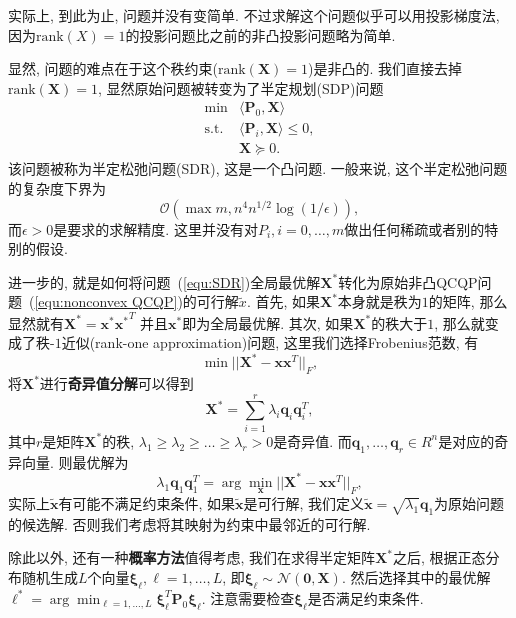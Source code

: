 \documentclass[a4paper,12pt]{article}
\begin{document}
实际上, 到此为止, 问题并没有变简单. 不过求解这个问题似乎可以用投影梯度法, 因为$\text{rank}(X)=1$的投影问题比之前的非凸投影问题略为简单.

显然, 问题的难点在于这个秩约束($\text{rank}(\bm{X}) = 1$)是非凸的.
我们直接去掉$\text{rank}(\bm{X}) = 1$, 显然原始问题被转变为了半定规划(SDP)问题
\begin{equation} \label{equ:SDR}
\begin{array}{cl}
{\min} & {\langle \bm{P}_0,\bm{X} \rangle} \\
{\text{s.t.}} & {\langle \bm{P}_i,\bm{X} \rangle \leq 0}, \\
{} & {\bm{X} \succeq 0}.
\end{array}
\end{equation}
该问题被称为半定松弛问题(SDR), 这是一个凸问题.
一般来说, 这个半定松弛问题的复杂度下界为
\begin{equation}
\mathcal{O}(\max{m,n}^4 n^{1/2}\log(1/\epsilon)),
\end{equation}
而$\epsilon>0$是要求的求解精度. 这里并没有对$P_i, i=0,\dots,m$做出任何稀疏或者别的特别的假设.

进一步的, 就是如何将问题~(\ref{equ:SDR})全局最优解$\bm{X}^*$转化为原始非凸QCQP问题~(\ref{equ:nonconvex QCQP})的可行解$\tilde{x}$. 
首先, 如果$\bm{X}^*$本身就是秩为$1$的矩阵, 那么显然就有$\bm{X}^* = \bm{x}^* {\bm{x}^*}^T$ 并且$\bm{x}^*$即为全局最优解.
其次, 如果$\bm{X}^*$的秩大于$1$, 那么就变成了秩-$1$近似(rank-one approximation)问题, 这里我们选择Frobenius范数, 有
\begin{equation}
\min || \bm{X}^* - \bm{x}\bm{x}^T ||_F,
\end{equation}
将$\bm{X}^*$进行\textbf{奇异值分解}可以得到
\begin{equation}
\bm{X}^* = \sum_{i=1}^r \lambda_i \bm{q}_i \bm{q}_i^T,
\end{equation}
其中$r$是矩阵$\bm{X}^*$的秩, $\lambda_1 \ge \lambda_2 \ge \dots \ge \lambda_r > 0$是奇异值.
而$\bm{q}_1,\dots,\bm{q}_r \in R^n$是对应的奇异向量.
则最优解为
\begin{equation}
\lambda_1 \bm{q}_1 \bm{q}_1^T = \arg\min_{\bm{x}} ||\bm{X}^* - \bm{x}\bm{x}^T||_F,
\end{equation}
实际上$\tilde{\bm{x}}$有可能不满足约束条件, 如果$\tilde{\bm{x}}$是可行解, 我们定义$\tilde{\bm{x}} = \sqrt{\lambda_1}\bm{q}_1$为原始问题的候选解.
否则我们考虑将其映射为约束中最邻近的可行解.

除此以外, 还有一种\textbf{概率方法}值得考虑, 我们在求得半定矩阵$\bm{X}^*$之后, 根据正态分布随机生成$L$个向量$\bm{\xi}_{\ell}, \ell=1,\dots,L$, 即$\bm{\xi}_{\ell} \sim \mathcal{N}(\bm{0},\bm{X})$.
然后选择其中的最优解$\ell^* = \arg\min_{\ell=1,\dots,L} \bm{\xi}_{\ell}^T \bm{P}_0 \bm{\xi}_{\ell}$.
注意需要检查$\bm{\xi}_{\ell}$是否满足约束条件.
\end{document}
